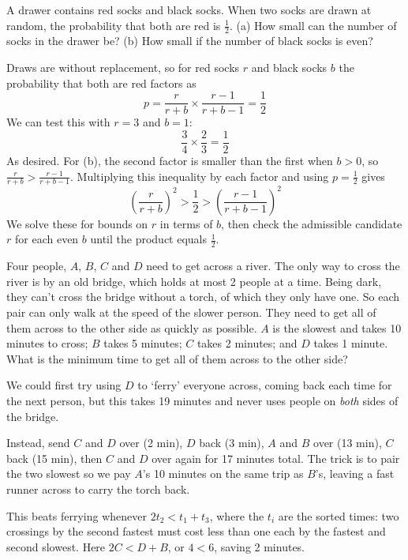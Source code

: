 \newpage

\begin{problem}
A drawer contains red socks and black socks. When two socks are drawn
at random, the probability that both are red is $\frac{1}{2}$. (a) How small can the number of socks in the drawer be? (b) How small if the number of black
socks is even? 
\end{problem}

\begin{solution}
Draws are without replacement, so for red socks $r$ and black socks $b$ the probability that both are red factors as
\[
p = \frac{r}{r+b} \times \frac{r-1}{r+b-1} = \frac{1}{2}
\]
We can test this with $r=3$ and $b=1$:
\[
\frac{3}{4} \times \frac{2}{3} = \frac{1}{2}
\]
As desired. For (b), the second factor is smaller than the first when $b > 0$, so $\frac{r}{r+b} > \frac{r-1}{r+b-1}$. Multiplying this inequality by each factor and using $p = \frac{1}{2}$ gives
\[
\left( \frac{r}{r+b} \right)^2 > \frac{1}{2} > \left( \frac{r-1}{r+b-1} \right)^2
\]
We solve these for bounds on $r$ in terms of $b$, then check the admissible candidate $r$ for each even $b$ until the product equals $\frac{1}{2}$.
\end{solution}

\begin{problem}
Four people, $A$, $B$, $C$ and $D$ need to get across a river. The only way to cross the river is
by an old bridge, which holds at most 2 people at a time. Being dark, they can't cross the
bridge without a torch, of which they only have one. So each pair can only walk at the
speed of the slower person. They need to get all of them across to the other side as
quickly as possible. $A$ is the slowest and takes 10 minutes to cross; $B$ takes 5 minutes; $C$
takes 2 minutes; and $D$ takes 1 minute.
What is the minimum time to get all of them across to the other side?
\end{problem}

\begin{solution}
We could first try using $D$ to `ferry' everyone across, coming back each time for the next person, but this takes 19 minutes and never uses people on \textit{both} sides of the bridge.

Instead, send $C$ and $D$ over (2 min), $D$ back (3 min), $A$ and $B$ over (13 min), $C$ back (15 min), then $C$ and $D$ over again for 17 minutes total. The trick is to pair the two slowest so we pay $A$'s 10 minutes on the same trip as $B$'s, leaving a fast runner across to carry the torch back.

This beats ferrying whenever $2t_2 < t_1 + t_3$, where the $t_i$ are the sorted times: two crossings by the second fastest must cost less than one each by the fastest and second slowest. Here $2C < D + B$, or $4 < 6$, saving 2 minutes.
\end{solution}

